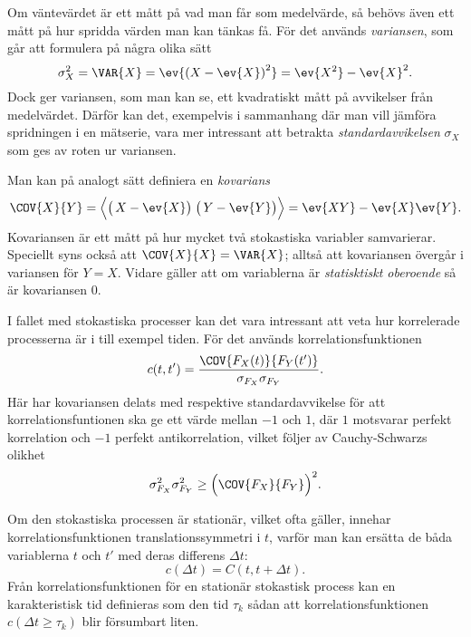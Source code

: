 Om väntevärdet är ett mått på vad man får som medelvärde, så behövs
även ett mått på hur spridda värden man kan tänkas få. För det används
\emph{variansen}, som går att formulera på några olika sätt
\begin{equation}\label{eq:VAR}
\sigma_X^2=\VAR{X} = \ev{\left(X-\ev{X} \right)^2} = \ev{X^2}-\ev{X}^2.
\end{equation}
Dock ger variansen, som man kan se, ett kvadratiskt mått på
avvikelser från medelvärdet. Därför kan det, exempelvis i sammanhang
där man vill jämföra spridningen i en mätserie, vara mer intressant
att betrakta \emph{standardavvikelsen} $\sigma_X$ som ges av roten ur
variansen.

Man kan på analogt sätt definiera en \emph{kovarians}
\begin{equation}\label{eq:COV}
\COV{X}{Y} 
= \Big\langle \big(\, X-\ev{X}\big)\;\big(\, Y-\ev{Y}\big) \Big\rangle
= \ev{XY}-\ev{X}\ev{Y}.
\end{equation}
Kovariansen är ett mått på hur mycket två stokastiska variabler
samvarierar. Speciellt syns också att $\COV{X}{X}=\VAR{X}$; alltså att
kovariansen övergår i variansen för $Y=X$. Vidare gäller att om
variablerna är \emph{statisktiskt oberoende} så är kovariansen 0.

I fallet med stokastiska processer kan det vara intressant att veta
hur korrelerade processerna är i till exempel tiden. För det används
korrelationsfunktionen 
\begin{equation}\label{eq:CORR}
c(t, t') = \frac{\COV{F_X(t)}{F_Y(t')}}{\sigma_{F_X}\sigma_{F_Y}}.
\end{equation}
Här har kovariansen delats med respektive standardavvikelse för att
korrelationsfuntionen ska ge ett värde mellan 
$-1$ och $1$, där $1$ motsvarar perfekt korrelation och $-1$ perfekt antikorrelation, vilket följer av Cauchy-Schwarzs\cite{Engelberg_noise2007} olikhet 
\begin{equation}
\sigma_{F_X}^2\sigma_{F_Y}^2\geq \Big(\COV{F_X}{F_Y}\Big)^2.
\end{equation}

Om den stokastiska processen är stationär, vilket ofta gäller, innehar korrelationsfunktionen
translationssymmetri i $t$, varför man kan
ersätta de båda variablerna $t$ och $t'$ med deras differens $\Delta t$:
\begin{equation}
c(\Delta t) = C(t, t+\Delta t).
\end{equation}
Från korrelationsfunktionen för en stationär stokastisk process kan en karakteristisk tid definieras som den tid $\tau_k$ sådan att korrelationsfunktionen $c(\Delta t\geq\tau_k)$ blir försumbart liten. 


